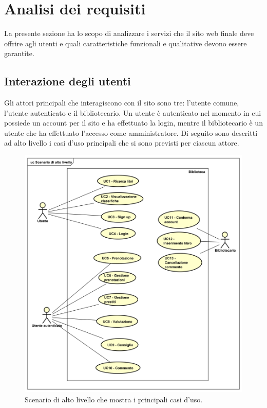 \section{Analisi dei requisiti}
La presente sezione ha lo scopo di analizzare i servizi che il sito web finale deve offrire agli utenti e quali caratteristiche funzionali e qualitative devono essere garantite.

\subsection{Interazione degli utenti}
Gli attori principali che interagiscono con il sito sono tre: l'utente comune, l'utente autenticato e il bibliotecario. Un utente è autenticato nel momento in cui possiede un account per il sito e ha effettuato la login, mentre il bibliotecario è un utente che ha effettuato l'accesso come amministratore. Di seguito sono descritti ad alto livello i casi d'uso principali che si sono previsti per ciascun attore.


\begin{figure}[H]
	\centering
	\includegraphics[width= 14cm]{immagini/user_case.png}
	\caption{Scenario di alto livello che mostra i principali casi d'uso.}
\end{figure}

